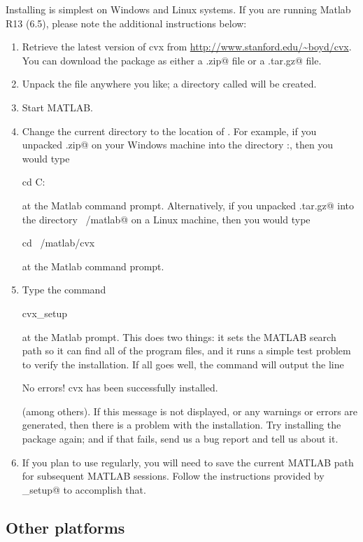 \documentclass[12pt]{article}
\begin{document}
Installing \cvx is simplest on Windows and Linux systems. If you are running Matlab
R13 (6.5), please note the additional instructions below:
\begin{enumerate}
\item Retrieve the latest version of cvx from \url{http://www.stanford.edu/~boyd/cvx}.
You can download the package as either a \verb@.zip@ file or a \verb@.tar.gz@ 
file.
\item Unpack the file anywhere you like; a directory called \verb@cvx@ will be created.
\item Start MATLAB.
\item Change the current directory to the location of \cvx.
For example, if you unpacked \verb@cvx.zip@ on your Windows machine into the
directory \verb@C:\Matlab\personal@, then you would type
\begin{code}
		cd C:\Matlab\personal\cvx
\end{code}
at the Matlab command prompt. Alternatively, if you unpacked \verb@cvx.tar.gz@
into the directory \verb@~/matlab@ on a Linux machine, then you would type
\begin{code}
		cd ~/matlab/cvx
\end{code}
at the Matlab command prompt.
\item Type the command
\begin{code}
		cvx_setup
\end{code}
at the Matlab prompt. This does two things: 
it sets the MATLAB search path so it can find all of the \cvx program files,
and it runs a simple test problem to verify the installation.
If all goes well, the command will output the line
\begin{code}
	No errors! cvx has been successfully installed.
\end{code}
(among others). If this message is not displayed, or any warnings or errors are generated,
then there is a problem with the \cvx installation. Try installing the package
again; and if that fails, send us a bug report and tell us about it.
\item If you plan to use \cvx regularly, you will need to save the current
MATLAB path for subsequent MATLAB sessions. Follow the instructions provided
by \verb@cvx_setup@ to accomplish that.
\end{enumerate}

\subsection{Other platforms}
\label{sec:othersys}
\end{document}
